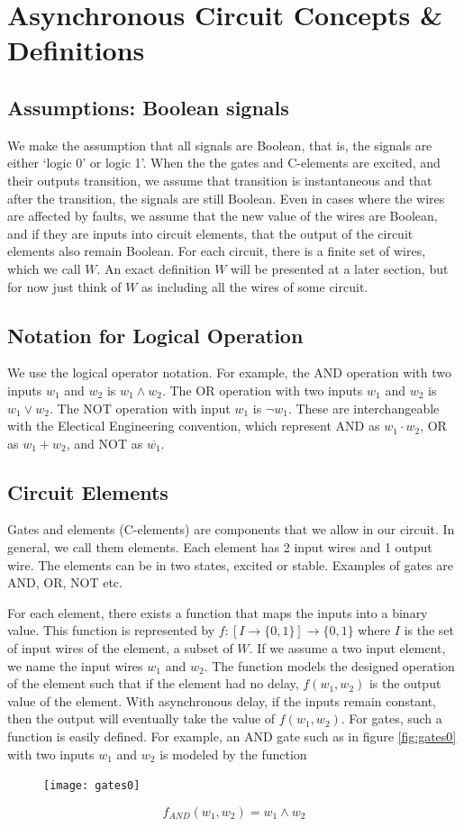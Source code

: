 \documentclass[12pt]{report}
\begin{document}
\chapter{Asynchronous Circuit Concepts \& Definitions}
\section{Assumptions:  Boolean signals}
We make the assumption that all signals are Boolean, that is, the signals are either `logic 0' or logic 1'.  When the the gates and C-elements are excited, and their outputs transition, we assume that transition is instantaneous and that after the transition, the signals are still Boolean.   
Even in cases where the wires are affected by faults, we assume that the new value of the wires are Boolean, and if they are inputs into circuit elements, that the output of the circuit elements also remain Boolean.  For each circuit, there is a finite set of wires, which we call $W$.  An exact definition $W$ will be presented at a later section, but for now just think of $W$ as including all the wires of some circuit.

\section{Notation for Logical Operation}
We use the logical operator notation.  For example, the AND operation with two inputs $w_1$ and $w_2$ is $w_1\wedge w_2$.
The OR operation with two inputs $w_1$ and $w_2$ is $w_1\vee w_2$.  The NOT operation with input $w_1$ is $\neg w_1$.  These are interchangeable with the Electical Engineering convention, which represent AND as $w_1\cdot w_2$, OR as $w_1+w_2$, and NOT as $\overline{w_1}$.

\section{Circuit Elements}
Gates and elements (C-elements) are components that we allow in our circuit.  In general, we call them elements.  Each element has 2 input wires and 1 output wire.  The elements can be in two states, excited or stable.  Examples of gates are AND, OR, NOT etc.

For each element, there exists a function that maps the inputs into a binary value.  This function is represented by $f:[I \to \{0,1\}] \to \{0,1\}$ where $I$ is the set of input wires of the element, a subset of $W$.  If we assume a two input element, we name the input wires $w_1$ and $w_2$.  The function models the designed operation of the element such that if the element had no delay, $f(w_1,w_2)$ is the output value of the element.  With asynchronous delay, if the inputs remain constant, then the output will eventually take the value of $f(w_1,w_2)$.  For gates, such a function is easily defined.  For example, an AND gate such as in figure \ref{fig:gates0} with two inputs $w_1$ and $w_2$ is modeled by the function 
\begin{figure}[h]
\centering
\texttt{[image: gates0]}
\end{figure}
\[
f_{AND}(w_1,w_2)= w_1\wedge w_2
\]
\end{document}
